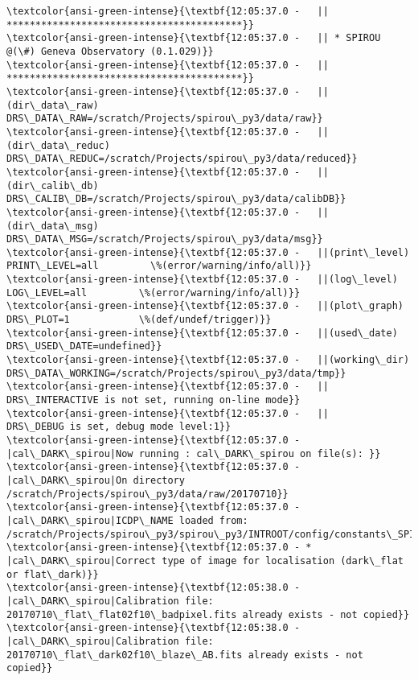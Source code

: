 \documentclass[11pt]{article}
\begin{document}
    \begin{Verbatim}[commandchars=\\\{\}]
\textcolor{ansi-green-intense}{\textbf{12:05:37.0 -   || *****************************************}}
\textcolor{ansi-green-intense}{\textbf{12:05:37.0 -   || * SPIROU @(\#) Geneva Observatory (0.1.029)}}
\textcolor{ansi-green-intense}{\textbf{12:05:37.0 -   || *****************************************}}
\textcolor{ansi-green-intense}{\textbf{12:05:37.0 -   ||(dir\_data\_raw)      DRS\_DATA\_RAW=/scratch/Projects/spirou\_py3/data/raw}}
\textcolor{ansi-green-intense}{\textbf{12:05:37.0 -   ||(dir\_data\_reduc)    DRS\_DATA\_REDUC=/scratch/Projects/spirou\_py3/data/reduced}}
\textcolor{ansi-green-intense}{\textbf{12:05:37.0 -   ||(dir\_calib\_db)      DRS\_CALIB\_DB=/scratch/Projects/spirou\_py3/data/calibDB}}
\textcolor{ansi-green-intense}{\textbf{12:05:37.0 -   ||(dir\_data\_msg)      DRS\_DATA\_MSG=/scratch/Projects/spirou\_py3/data/msg}}
\textcolor{ansi-green-intense}{\textbf{12:05:37.0 -   ||(print\_level)       PRINT\_LEVEL=all         \%(error/warning/info/all)}}
\textcolor{ansi-green-intense}{\textbf{12:05:37.0 -   ||(log\_level)         LOG\_LEVEL=all         \%(error/warning/info/all)}}
\textcolor{ansi-green-intense}{\textbf{12:05:37.0 -   ||(plot\_graph)        DRS\_PLOT=1            \%(def/undef/trigger)}}
\textcolor{ansi-green-intense}{\textbf{12:05:37.0 -   ||(used\_date)         DRS\_USED\_DATE=undefined}}
\textcolor{ansi-green-intense}{\textbf{12:05:37.0 -   ||(working\_dir)       DRS\_DATA\_WORKING=/scratch/Projects/spirou\_py3/data/tmp}}
\textcolor{ansi-green-intense}{\textbf{12:05:37.0 -   ||                    DRS\_INTERACTIVE is not set, running on-line mode}}
\textcolor{ansi-green-intense}{\textbf{12:05:37.0 -   ||                    DRS\_DEBUG is set, debug mode level:1}}
\textcolor{ansi-green-intense}{\textbf{12:05:37.0 -   |cal\_DARK\_spirou|Now running : cal\_DARK\_spirou on file(s): }}
\textcolor{ansi-green-intense}{\textbf{12:05:37.0 -   |cal\_DARK\_spirou|On directory /scratch/Projects/spirou\_py3/data/raw/20170710}}
\textcolor{ansi-green-intense}{\textbf{12:05:37.0 -   |cal\_DARK\_spirou|ICDP\_NAME loaded from: /scratch/Projects/spirou\_py3/spirou\_py3/INTROOT/config/constants\_SPIROU.py}}
\textcolor{ansi-green-intense}{\textbf{12:05:37.0 - * |cal\_DARK\_spirou|Correct type of image for localisation (dark\_flat or flat\_dark)}}
\textcolor{ansi-green-intense}{\textbf{12:05:38.0 -   |cal\_DARK\_spirou|Calibration file: 20170710\_flat\_flat02f10\_badpixel.fits already exists - not copied}}
\textcolor{ansi-green-intense}{\textbf{12:05:38.0 -   |cal\_DARK\_spirou|Calibration file: 20170710\_flat\_dark02f10\_blaze\_AB.fits already exists - not copied}}

\end{Verbatim}
\end{document}
